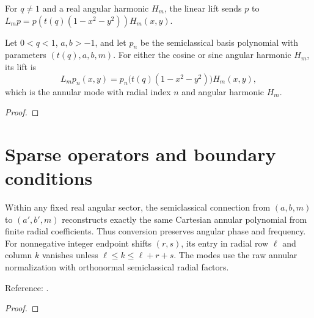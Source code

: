 \begin{supporting}
\begin{definition}
\label{def:annulus-lift}
\leanok
For $q\ne1$ and a real angular harmonic $H_m$, the linear lift sends $p$ to $L_mp=p(t(q)(1-x^2-y^2))H_m(x,y)$.
\end{definition}

\begin{theorem}
\label{thm:annulus-lift}
\leanok
Let $0<q<1$, $a,b>-1$, and let $p_n$ be the semiclassical basis polynomial
with parameters $(t(q),a,b,m)$. For either the cosine or sine angular harmonic $H_m$, its lift is
\[
 L_mp_n(x,y)=p_n\bigl(t(q)(1-x^2-y^2)\bigr)H_m(x,y),
\]
which is the annular mode with radial index $n$ and angular harmonic $H_m$.
\end{theorem}
\begin{proof}
\leanok
\end{proof}
\end{supporting}


\section{Sparse operators and boundary conditions}\label{sec:annular-operators}

\begin{theorem}
\label{thm:zernike-annulus-conversion}
\leanok
Within any fixed real angular sector, the semiclassical connection from $(a,b,m)$
to $(a',b',m)$ reconstructs exactly the same Cartesian annular polynomial from
finite radial coefficients. Thus conversion preserves angular phase and frequency.
For nonnegative integer endpoint shifts $(r,s)$, its entry in radial row $\ell$
and column $k$ vanishes unless $\ell\le k\le\ell+r+s$.
The modes use the raw annular normalization with orthonormal semiclassical radial factors.

Reference: \cite[Section 4.1]{pgso}.
\end{theorem}
\begin{proof}
\leanok
\end{proof}

